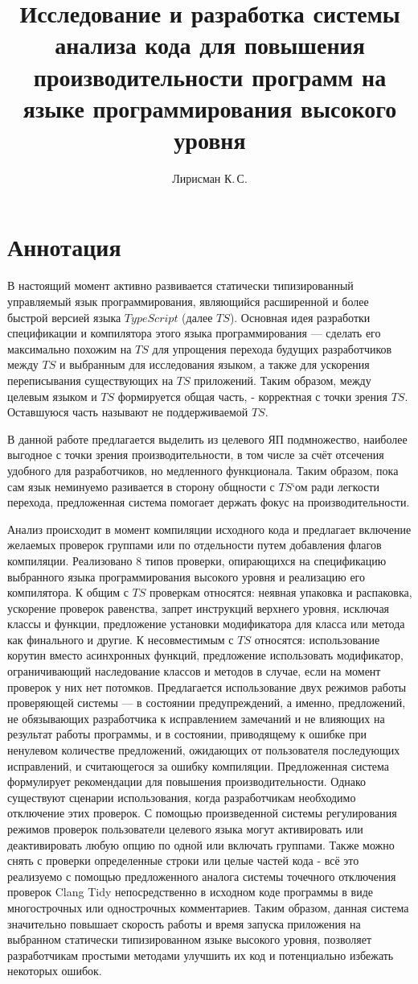 \documentclass{mipt-thesis-bs}
\title{Исследование и разработка системы анализа кода для повышения производительности программ на языке программирования высокого уровня}
\author{Лирисман К.\,С.}
\begin{document}
\titlecontents
\chapter{Аннотация}

В настоящий момент активно развивается статически типизированный управляемый язык
программирования, являющийся расширенной и более быстрой версией языка $TypeScript$ (далее $TS$).
Основная идея разработки спецификации и компилятора этого языка программирования — сделать его максимально
похожим на $TS$ для упрощения перехода будущих разработчиков между $TS$ и
выбранным для исследования языком, а также для ускорения переписывания существующих на $TS$ приложений.
Таким образом, между целевым языком и $TS$ формируется общая часть, - корректная с точки зрения $TS$.
Оставшуюся часть называют не поддерживаемой $TS$.

В данной работе предлагается выделить из целевого ЯП подмножество, наиболее выгодное с точки зрения производительности,
в том числе за счёт отсечения удобного для разработчиков, но медленного функционала. Таким образом, пока сам язык неминуемо
разивается в сторону общности с $TS$`ом ради легкости перехода, предложенная система помогает держать фокус
на производительности.

Анализ происходит в момент компиляции исходного кода и предлагает включение желаемых
проверок группами или по отдельности путем добавления флагов компиляции. Реализовано
8 типов проверки, опирающихся на спецификацию выбранного языка
программирования высокого уровня и реализацию его компилятора. К общим с $TS$ проверкам относятся:
неявная упаковка и распаковка, ускорение проверок равенства, запрет инструкций верхнего уровня, исключая
классы и функции, предложение установки модификатора для класса или метода как
финального и другие. К несовместимым с $TS$ относятся: использование корутин вместо асинхронных функций,
предложение использовать модификатор, ограничивающий наследование классов и методов в случае, если на
момент проверок у них нет потомков.
Предлагается использование двух режимов работы проверяющей системы — в состоянии
предупреждений, а именно, предложений, не обязывающих разработчика к исправлением замечаний и не
влияющих на результат работы программы, и в состоянии, приводящему к ошибке при ненулевом количестве
предложений, ожидающих от пользователя последующих исправлений, и считающегося за
ошибку компиляции.
Предложенная система формулирует рекомендации для повышения производительности. Однако
существуют сценарии использования, когда разработчикам необходимо отключение этих проверок.
С помощью произведенной системы регулирования режимов проверок пользователи целевого языка
могут активировать или деактивировать любую опцию по одной или включать группами.
Также можно снять с проверки определенные строки или целые частей кода - всё это реализуемо с помощью
предложенного аналога системы точечного отключения проверок Clang Tidy непосредственно
в исходном коде программы в виде многострочных или однострочных комментариев.
Таким образом, данная система значительно повышает скорость работы и время запуска
приложения на выбранном статически типизированном языке высокого уровня, позволяет разработчикам
простыми методами улучшить их код и потенциально избежать некоторых ошибок.
\end{document}
